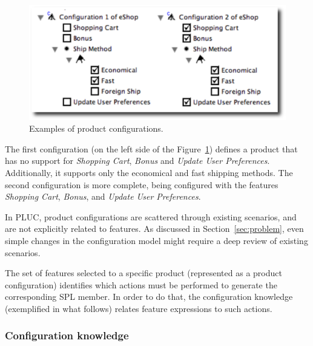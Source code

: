 \documentclass{acm_proc_article-sp}
\begin{document}
 \begin{figure}[h]
 \begin{center}
  \includegraphics[scale=0.33]{img/pc-04.eps}
   \caption{Examples of product configurations.}
  \label{fig:product-config-01-02}
  \end{center}
\end{figure}


The first configuration (on the left side of the
Figure~\ref{fig:product-config-01-02}) defines a product that has no support for
\emph{Shopping Cart}, \emph{Bonus} and \emph{Update User Preferences}.
Additionally, it supports only the economical and fast shipping methods. The
second configuration is more complete, being configured with the features
\emph{Shopping Cart}, \emph{Bonus}, and \emph{Update User Preferences}.

In PLUC, product configurations are scattered through existing scenarios, and
are not explicitly related to features. As discussed in
Section~\ref{sec:problem}, even simple changes in the configuration model might
require a deep review of existing scenarios. 

The set of features selected to a specific product (represented as a product
configuration) identifies which actions must be performed to
generate the corresponding SPL member. In order to do that, the configuration
knowledge (exemplified in what follows) relates feature expressions to such
actions. 

\subsubsection{Configuration knowledge}
\end{document}
